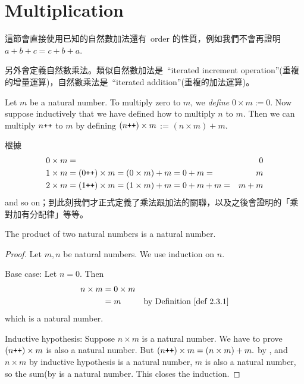 \section{Multiplication}\label{sec 2.3}

\newcommand{\X}{\times}

\begin{note}
這節會直接使用已知的自然數加法還有\ order 的性質，例如我們不會再證明\ \(a + b + c = c + b + a\).

另外會定義自然數乘法。類似自然數加法是\ ``iterated increment operation''(重複的增量運算)，自然數乘法是\ ``iterated addition''(重複的加法運算)。
\end{note}

\begin{definition}\label{def 2.3.1} Let \(m\) be a natural number. To multiply zero to \(m\), we \emph{define} \(0 \X m := 0\). Now suppose inductively that we have defined how to multiply \(n\) to \(m\). Then we can multiply \(n\texttt{++}\) to \(m\) by defining \((n\INC) \X m\) := \((n \X m) + m\).
\end{definition}

\begin{note}
根據\ 
    \begin{align*}
    0 \X m & = & 0 \\
    1 \X m & = (0\INC) \X m = (0 \X m) + m = 0 + m = & m \\
    2 \X m & = (1\INC) \X m = (1 \X m) + m = 0 + m + m = & m + m
    \end{align*}
and so on；到此刻我們才正式定義了乘法跟加法的關聯，以及之後會證明的「乘對加有分配律」等等。
\end{note}

\begin{additional corollary} \label{ac 2.3.1}
The product of two natural numbers is a natural number.
\end{additional corollary}
\begin{proof}
Let \(m, n\) be natural numbers. We use induction on \(n\).

Base case: Let \(n = 0\). Then
\begin{align*}
    n \X m & = 0 \X m & \\
           & = m      & \text{by \DEF{2.3.1}}
\end{align*}
which is a natural number.

Inductive hypothesis: Suppose \(n \X m\) is a natural number. We have to prove \((n\INC) \X m\) is also a natural number. But \((n\INC) \X m = (n \X m) + m.\) by , and \(n \X m\) by inductive hypothesis is a natural number, \(m\) is also a natural number, so the sum(by  is a natural number. This closes the induction.
\end{proof}

